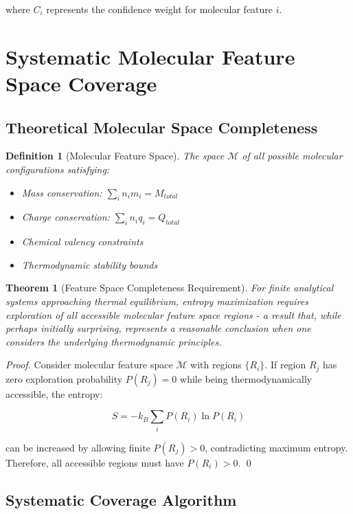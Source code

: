 \documentclass[11pt,a4paper]{article}
\newtheorem{theorem}{Theorem}
\newtheorem{definition}{Definition}
\begin{document}
where $C_i$ represents the confidence weight for molecular feature $i$.

\section{Systematic Molecular Feature Space Coverage}

\subsection{Theoretical Molecular Space Completeness}

\begin{definition}[Molecular Feature Space]
The space $\mathcal{M}$ of all possible molecular configurations satisfying:
\begin{itemize}
\item Mass conservation: $\sum_i n_i m_i = M_{total}$
\item Charge conservation: $\sum_i n_i q_i = Q_{total}$
\item Chemical valency constraints
\item Thermodynamic stability bounds
\end{itemize}
\end{definition}

\begin{theorem}[Feature Space Completeness Requirement]
For finite analytical systems approaching thermal equilibrium, entropy maximization requires exploration of all accessible molecular feature space regions - a result that, while perhaps initially surprising, represents a reasonable conclusion when one considers the underlying thermodynamic principles.
\end{theorem}

\begin{proof}
Consider molecular feature space $\mathcal{M}$ with regions $\{R_i\}$. If region $R_j$ has zero exploration probability $P(R_j) = 0$ while being thermodynamically accessible, the entropy:

\begin{equation}
S = -k_B \sum_i P(R_i) \ln P(R_i)
\end{equation}

can be increased by allowing finite $P(R_j) > 0$, contradicting maximum entropy. Therefore, all accessible regions must have $P(R_i) > 0$. \qed
\end{proof}

\subsection{Systematic Coverage Algorithm}
\end{document}
